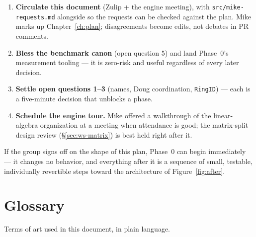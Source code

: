 \documentclass[11pt,oneside]{report}
\newcommand{\code}[1]{\textcolor{m2code}{\texttt{#1}}}
\newcommand{\file}[1]{\textcolor{m2file}{\texttt{#1}}}
\begin{document}
\begin{enumerate}
\item \textbf{Circulate this document} (Zulip + the engine meeting), with
  \file{src/mike-requests.md} alongside so the requests can be checked
  against the plan. Mike marks up Chapter~\ref{ch:plan}; disagreements
  become edits, not debates in PR comments.
\item \textbf{Bless the benchmark canon} (open question 5) and land
  Phase~0's measurement tooling --- it is zero-risk and useful regardless
  of every later decision.
\item \textbf{Settle open questions 1--3} (names, Doug coordination,
  \code{RingID}) --- each is a five-minute decision that unblocks a phase.
\item \textbf{Schedule the engine tour.} Mike offered a walkthrough of the
  linear-algebra organization at a meeting when attendance is good; the
  matrix-split design review (\S\ref{sec:ws-matrix}) is best held right
  after it.
\end{enumerate}

If the group signs off on the shape of this plan, Phase~0 can begin
immediately --- it changes no behavior, and everything after it is a
sequence of small, testable, individually revertible steps toward the
architecture of Figure~\ref{fig:after}.

\appendix
\chapter{Glossary}
\label{app:glossary}
Terms of art used in this document, in plain language.
\end{document}
